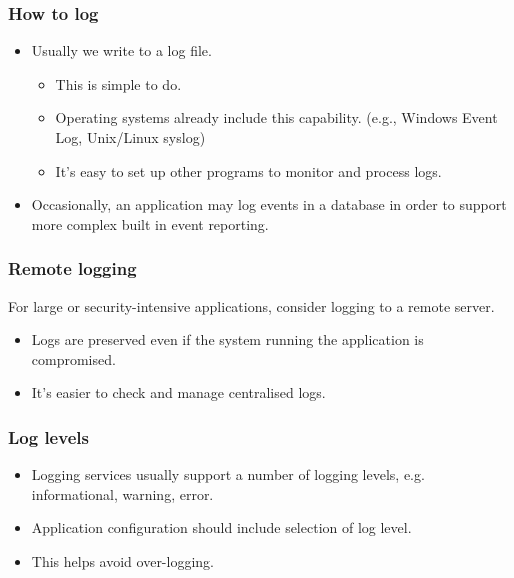 \documentclass[10pt]{beamer}
\begin{document}
\begin{frame}
  \frametitle{How to log}

 \begin{itemize}
  \item Usually we write to a log file.
	  \begin{itemize} 
		  \item This is simple to do.
		  \item Operating systems already include this capability.  (e.g., Windows Event Log, Unix/Linux syslog)
		  \item It's easy to set up other programs to monitor and process logs.
	  \end{itemize}
  \item Occasionally, an application may log events in a database in order to support more complex built in event reporting.

  \end{itemize}
\end{frame}



\begin{frame}
  \frametitle{Remote logging}

  For large or security-intensive applications, consider logging to a remote server.
 \begin{itemize}
  \item Logs are preserved even if the system running the application is compromised.
  \item It's easier to check and manage centralised logs.
  \end{itemize}
\end{frame}



\begin{frame}
  \frametitle{Log levels}

 \begin{itemize}
  \item Logging services usually support a number of logging levels, e.g. informational, warning, error.
  \item Application configuration should include selection of log level.
  \item This helps avoid over-logging.
  \end{itemize}
\end{frame}
\end{document}
